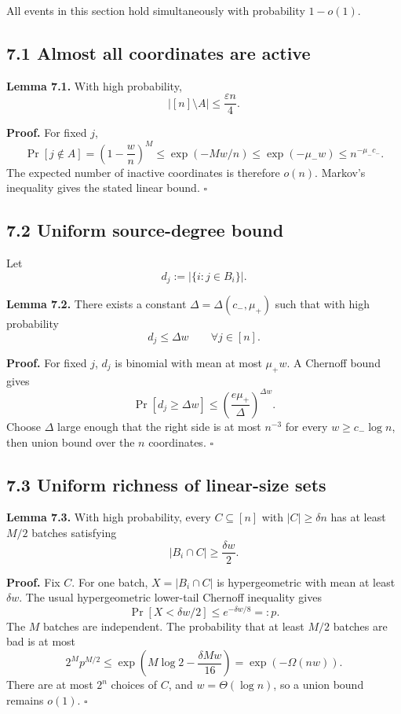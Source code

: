 \documentclass[
]{article}
\begin{document}
All events in this section hold simultaneously with probability
\(1-o(1)\).

\hypertarget{almost-all-coordinates-are-active}{%
\subsection{7.1 Almost all coordinates are
active}\label{almost-all-coordinates-are-active}}

\textbf{Lemma 7.1.} With high probability, \[
|[n]\setminus A|\le\frac{\varepsilon n}{4}.
\]

\textbf{Proof.} For fixed \(j\), \[
\Pr[j\notin A]
=
\left(1-\frac wn\right)^M
\le
\exp(-Mw/n)
\le
\exp(-\mu_-w)
\le
n^{-\mu_-c_-}.
\] The expected number of inactive coordinates is therefore \(o(n)\).
Markov's inequality gives the stated linear bound. \(\square\)

\hypertarget{uniform-source-degree-bound}{%
\subsection{7.2 Uniform source-degree
bound}\label{uniform-source-degree-bound}}

Let \[
d_j:=|\{i:j\in B_i\}|.
\]

\textbf{Lemma 7.2.} There exists a constant \(\Delta=\Delta(c_-,\mu_+)\)
such that with high probability \[
d_j\le\Delta w\qquad\forall j\in[n].
\]

\textbf{Proof.} For fixed \(j\), \(d_j\) is binomial with mean at most
\(\mu_+w\). A Chernoff bound gives \[
\Pr[d_j\ge\Delta w]
\le
\left(\frac{e\mu_+}{\Delta}\right)^{\Delta w}.
\] Choose \(\Delta\) large enough that the right side is at most
\(n^{-3}\) for every \(w\ge c_-\log n\), then union bound over the \(n\)
coordinates. \(\square\)

\hypertarget{uniform-richness-of-linear-size-sets}{%
\subsection{7.3 Uniform richness of linear-size
sets}\label{uniform-richness-of-linear-size-sets}}

\textbf{Lemma 7.3.} With high probability, every \(C\subseteq[n]\) with
\(|C|\ge\delta n\) has at least \(M/2\) batches satisfying \[
|B_i\cap C|\ge\frac{\delta w}{2}.
\]

\textbf{Proof.} Fix \(C\). For one batch, \(X=|B_i\cap C|\) is
hypergeometric with mean at least \(\delta w\). The usual hypergeometric
lower-tail Chernoff inequality gives \[
\Pr[X<\delta w/2]\le e^{-\delta w/8}=:p.
\] The \(M\) batches are independent. The probability that at least
\(M/2\) batches are bad is at most \[
2^M p^{M/2}
\le
\exp\left(M\log2-\frac{\delta Mw}{16}\right)
=
\exp(-\Omega(nw)).
\] There are at most \(2^n\) choices of \(C\), and \(w=\Theta(\log n)\),
so a union bound remains \(o(1)\). \(\square\)
\end{document}
